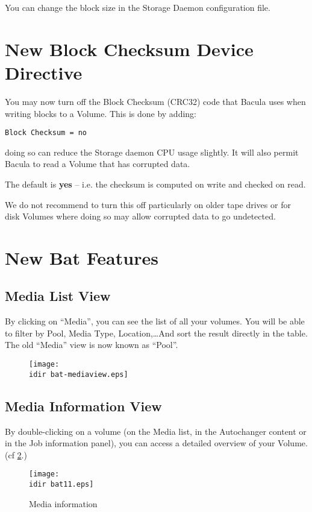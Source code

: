 You can change the block size in the Storage Daemon configuration file.

\section{New {\bf Block Checksum} Device Directive}
You may now turn off the Block Checksum (CRC32) code
that Bacula uses when writing blocks to a Volume.  This is
done by adding:

\begin{verbatim}
Block Checksum = no
\end{verbatim}

doing so can reduce the Storage daemon CPU usage slightly.  It
will also permit Bacula to read a Volume that has corrupted data.

The default is {\bf yes} -- i.e. the checksum is computed on write
and checked on read. 

We do not recommend to turn this off particularly on older tape
drives or for disk Volumes where doing so may allow corrupted data
to go undetected.

\section{New Bat Features}

\subsection{Media List View}

By clicking on ``Media'', you can see the list of all your volumes. You will be
able to filter by Pool, Media Type, Location,\dots And sort the result directly
in the table. The old ``Media'' view is now known as ``Pool''.
\begin{figure}[htbp]
  \centering
  \texttt{[image: \\idir bat-mediaview.eps]}
  \label{fig:mediaview}
\end{figure}


\subsection{Media Information View}

By double-clicking on a volume (on the Media list, in the Autochanger content
or in the Job information panel), you can access a detailed overview of your
Volume. (cf \ref{fig:mediainfo}.)
\begin{figure}[htbp]
  \centering
  \texttt{[image: \\idir bat11.eps]}  
  \caption{Media information}
  \label{fig:mediainfo}
\end{figure}

